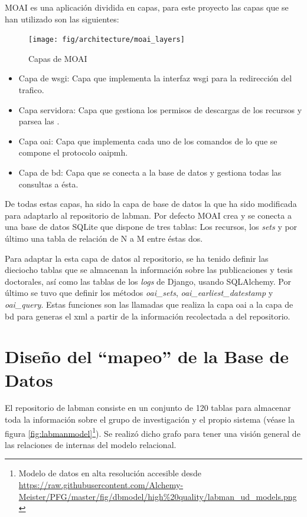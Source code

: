 MOAI es una aplicación dividida en capas, para este proyecto las capas que se han utilizado son las siguientes:

\begin{figure}[!htbp]
	\centering
	\texttt{[image: fig/architecture/moai\_layers]}
	\caption{Capas de MOAI}
	\label{fig:moai_layers}
\end{figure}

\begin{itemize}
	\item {Capa de \acrshort{wsgi}:} Capa que implementa la interfaz \acrshort{wsgi} para la redirección del trafico.
	\item {Capa servidora:} Capa que gestiona los permisos de descargas de los recursos y parsea las .
	\item {Capa \acrshort{oai}:} Capa que implementa cada uno de los comandos de lo que se compone el protocolo \acrshort{oaipmh}.
	\item {Capa de \acrshort{bd}:} Capa que se conecta a la base de datos y gestiona todas las consultas a ésta.
\end{itemize}

De todas estas capas, ha sido la capa de base de datos la que ha sido modificada para adaptarlo al repositorio de \acrshort{labman}. Por defecto MOAI crea y se conecta a una base de datos SQLite que dispone de tres tablas: Los recursos, los \textit{sets} y por último una tabla de relación de N a M entre éstas dos.

Para adaptar la esta capa de datos al repositorio, se ha tenido definir las dieciocho tablas que se almacenan la información sobre las publicaciones y tesis doctorales, así como las tablas de los \textit{logs} de Django, usando SQLAlchemy. Por último se tuvo que definir los métodos \textit{oai\_sets}, \textit{oai\_earliest\_datestamp} y \textit{oai\_query}. Estas funciones son las llamadas que realiza la capa \acrshort{oai} a la capa de \acrshort{bd} para generas el \acrshort{xml} a partir de la información recolectada a del repositorio.

\section{Diseño del ``mapeo'' de la Base de Datos}

El repositorio de \acrshort{labman} consiste en un conjunto de 120 tablas para almacenar toda la información sobre el grupo de investigación y el propio sistema (véase la figura \ref{fig:labmanmodel}\footnote{Modelo de datos en alta resolución accesible desde \url{https://raw.githubusercontent.com/Alchemy-Meister/PFG/master/fig/dbmodel/high\%20quality/labman\_ud\_models.png}}). Se realizó dicho grafo para tener una visión general de las relaciones de internas del modelo relacional.

